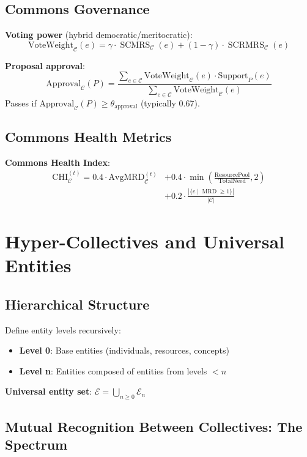 \documentclass[11pt,a4paper]{article}
\theoremstyle{definition}
\theoremstyle{remark}
\newcommand{\E}{\mathcal{E}}
\newcommand{\C}{\mathcal{C}}
\DeclareMathOperator{\SCMRS}{SCMRS}
\DeclareMathOperator{\SCRMRS}{SCRMRS}
\DeclareMathOperator{\MRD}{MRD}
\begin{document}
\subsection{Commons Governance}

\textbf{Voting power} (hybrid democratic/meritocratic):
\[ \text{VoteWeight}_\C(e) = \gamma \cdot \SCMRS_\C(e) + (1-\gamma) \cdot \SCRMRS_\C(e) \]

\textbf{Proposal approval}:
\[ \text{Approval}_\C(P) = \frac{\sum_{e \in \C} \text{VoteWeight}_\C(e) \cdot \text{Support}_P(e)}{\sum_{e \in \C} \text{VoteWeight}_\C(e)} \]
Passes if $\text{Approval}_\C(P) \ge \theta_{\text{approval}}$ (typically 0.67).

\subsection{Commons Health Metrics}

\textbf{Commons Health Index}:
\begin{align*}
\text{CHI}_\C^{(t)} = 0.4 \cdot \text{AvgMRD}_\C^{(t)} &+ 0.4 \cdot \min\left(\frac{\text{ResourcePool}}{\text{TotalNeed}}, 2\right) \\
&+ 0.2 \cdot \frac{|\{e \mid \MRD \ge 1\}|}{|\C|}
\end{align*}

\section{Hyper-Collectives and Universal Entities}

\subsection{Hierarchical Structure}

Define entity levels recursively:
\begin{itemize}
\item \textbf{Level 0}: Base entities (individuals, resources, concepts)
\item \textbf{Level n}: Entities composed of entities from levels $< n$
\end{itemize}

\textbf{Universal entity set}: $\E = \bigcup_{n \ge 0} \E_n$

\subsection{Mutual Recognition Between Collectives: The Spectrum}
\end{document}
